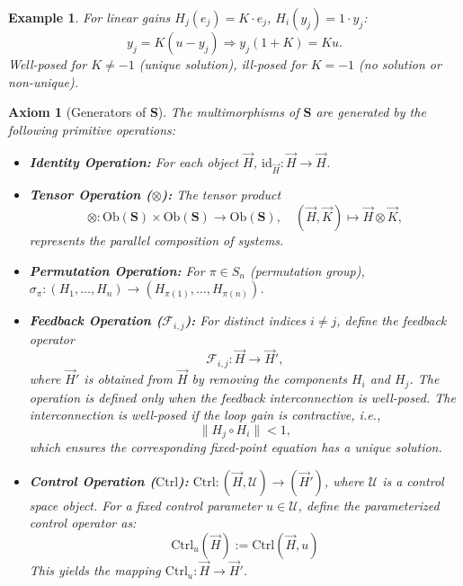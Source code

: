 \documentclass[11pt]{article}
\newtheorem{axiom}{Axiom}
\newtheorem{example}{Example}
\begin{document}
\begin{example}
For linear gains $H_j(e_j) = K \cdot e_j$, $H_i(y_j) = 1 \cdot y_j$:
\[
y_j = K(u - y_j) \Rightarrow y_j(1 + K) = Ku.
\]
Well-posed for $K \neq -1$ (unique solution), ill-posed for $K = -1$ (no solution or non-unique).
\end{example}

\begin{axiom}[Generators of $\mathbf{S}$]\label{ax:S2}
The multimorphisms of $\mathbf{S}$ are generated by the following primitive operations:

\begin{itemize}
    \item \textbf{Identity Operation:} For each object $\vec{H}$, $\mathrm{id}_{\vec{H}}: \vec{H} \to \vec{H}$.

    \item \textbf{Tensor Operation ($\otimes$):}
	The tensor product
	\[
	\otimes : \mathrm{Ob}(\mathbf{S}) \times \mathrm{Ob}(\mathbf{S}) \to \mathrm{Ob}(\mathbf{S}),
	\quad
	(\vec{H}, \vec{K}) \mapsto \vec{H} \otimes \vec{K},
	\]
	represents the \emph{parallel composition} of systems.


    \item \textbf{Permutation Operation:} For $\pi \in S_n$ (permutation group), $\sigma_{\pi}: (H_1, \dots, H_n) \to (H_{\pi(1)}, \dots, H_{\pi(n)})$.


	\item \textbf{Feedback Operation ($\mathcal{F}_{i,j}$):}
		For distinct indices $i \neq j$, define the feedback operator
		\[
		\mathcal{F}_{i,j}: \vec{H} \to \vec{H}',
		\]
		where $\vec{H}'$ is obtained from $\vec{H}$ by removing the components $H_i$ and $H_j$.
		The operation is defined only when the feedback interconnection is \emph{well-posed}. The interconnection is well-posed if the loop gain is contractive, i.e.,
		\[
		\|H_j \circ H_i\| < 1,
		\]
		which ensures the corresponding fixed-point equation has a unique solution.


    \item \textbf{Control Operation ($\mathrm{Ctrl}$):} $\mathrm{Ctrl}: (\vec{H}, \mathcal{U}) \to (\vec{H}')$, where $\mathcal{U}$ is a control space object. For a fixed control parameter $u \in \mathcal{U}$, define the parameterized control operator as:
\[
\mathrm{Ctrl}_{u}(\vec{H}) := \mathrm{Ctrl}(\vec{H}, u)
\]
This yields the mapping $\mathrm{Ctrl}_{u}: \vec{H} \to \vec{H}'$.
\end{itemize}
\end{axiom}
\end{document}
